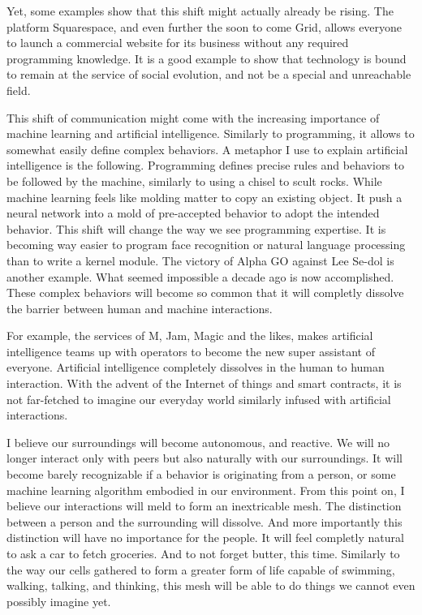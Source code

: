 Yet, some examples show that this shift might actually already be rising.
The platform Squarespace, and even further the soon to come Grid, allows everyone to launch a commercial website for its business without any required programming knowledge.
It is a good example to show that technology is bound to remain at the service of social evolution, and not be a special and unreachable field.

This shift of communication might come with the increasing importance of machine learning and artificial intelligence.
Similarly to programming, it allows to somewhat easily define complex behaviors.
A metaphor I use to explain artificial intelligence is the following.
Programming defines precise rules and behaviors to be followed by the machine, similarly to using a chisel to scult rocks.
While machine learning feels like molding matter to copy an existing object.
It push a neural network into a mold of pre-accepted behavior to adopt the intended behavior.
This shift will change the way we see programming expertise.
It is becoming way easier to program face recognition or natural language processing than to write a kernel module.
The victory of Alpha GO against Lee Se-dol is another example.
What seemed impossible a decade ago is now accomplished.
These complex behaviors will become so common that it will completly dissolve the barrier between human and machine interactions.

For example, the services of M, Jam, Magic and the likes, makes artificial intelligence teams up with operators to become the new super assistant of everyone.
Artificial intelligence completely dissolves in the human to human interaction.
With the advent of the Internet of things and smart contracts, it is not far-fetched to imagine our everyday world similarly infused with artificial interactions.

I believe our surroundings will become autonomous, and reactive.
We will no longer interact only with peers but also naturally with our surroundings.
It will become barely recognizable if a behavior is originating from a person, or some machine learning algorithm embodied in our environment.
From this point on, I believe our interactions will meld to form an inextricable mesh.
The distinction between a person and the surrounding will dissolve.
And more importantly this distinction will have no importance for the people.
It will feel completly natural to ask a car to fetch groceries.
And to not forget butter, this time.
Similarly to the way our cells gathered to form a greater form of life capable of swimming, walking, talking, and thinking, this mesh will be able to do things we cannot even possibly imagine yet.

